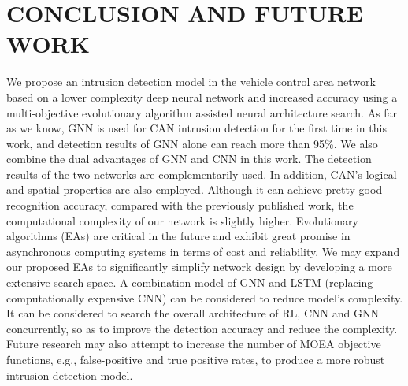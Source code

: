 \documentclass[lettersize,journal]{IEEEtran}
\begin{document}
\section{CONCLUSION AND FUTURE WORK}\label{section_conclusion}
We propose an intrusion detection model in the vehicle control area network based on a lower complexity deep neural network and increased accuracy using a multi-objective evolutionary algorithm assisted neural architecture search. As far as we know, GNN is used for CAN intrusion detection for the first time in this work, and detection results of GNN alone can reach more than 95\%. We also combine the dual advantages of GNN and CNN in this work. The detection results of the two networks are complementarily used. In addition, CAN's logical and spatial properties are also employed. Although it can achieve pretty good recognition accuracy, compared with the previously published work, the computational complexity of our network is slightly higher. Evolutionary algorithms (EAs) are critical in the future and exhibit great promise in asynchronous computing systems in terms of cost and reliability. We may expand our proposed EAs to significantly simplify network design by developing a more extensive search space. A combination model of GNN and LSTM (replacing computationally expensive CNN) can be considered to reduce model’s complexity. It can be considered to search the overall architecture of RL, CNN and GNN concurrently, so as to improve the detection accuracy and reduce the complexity. Future research may also attempt to increase the number of MOEA objective functions, e.g., false-positive and true positive rates, to produce a more robust intrusion detection model.




\end{document}
